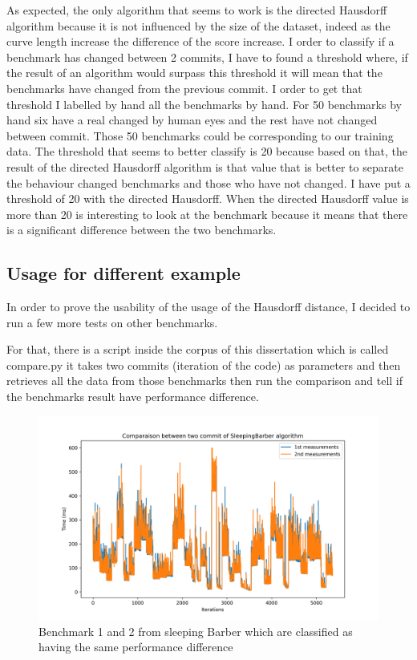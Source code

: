 \documentclass{article}
\begin{document}
As expected, the only algorithm that seems to work is the directed Hausdorff algorithm because it is not influenced by the size of the dataset, indeed as the curve length increase the difference of the score increase. 
I order to classify if a benchmark has changed between 2 commits, I have to found a threshold where, if the result of an algorithm would surpass this threshold it will mean that the benchmarks have changed from the previous commit. I order to get that threshold I labelled by hand all the benchmarks by hand. For 50 benchmarks by hand six have a real changed by human eyes and the rest have not changed between commit. Those 50 benchmarks could be corresponding to our training data. The threshold that seems to better classify is 20 because based on that, the result of the directed Hausdorff algorithm is that value that is better to separate the behaviour changed benchmarks and those who have not changed.
I have put a threshold of 20 with the directed Hausdorff. When the directed Hausdorff value is more than 20 is interesting to look at the benchmark because it means that there is a significant difference between the two benchmarks.


\subsection{Usage for different example}


In order to prove the usability of the usage of the Hausdorff distance, I decided to run a few more tests on other benchmarks.

For that, there is a script inside the corpus of this dissertation which is called compare.py it takes two commits (iteration of the code) as parameters and then retrieves all the data from those benchmarks then run the comparison and tell if the benchmarks result have performance difference. \\

\begin{figure}[]
    \centering
    \includegraphics[width=1\textwidth]{images/plot_SleepingBarber_4.069999999999936.png}
    \caption{Benchmark 1 and 2 from sleeping Barber which are classified as having the same performance difference}
    \label{fig:bench_1_2_1}
\end{figure}
\end{document}
